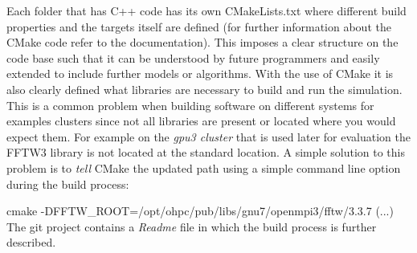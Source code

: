 \documentclass[master.tex]{subfiles}
\begin{document}
Each folder that has C++ code has its own CMakeLists.txt where different build properties and the targets itself are defined (for further information about the CMake code refer to the documentation).\newline
This imposes a clear structure on the code base such that it can be understood by future programmers and easily extended to include further models or algorithms.\newline
With the use of CMake it is also clearly defined what libraries are necessary to build and run the simulation. This is a common problem when building software on different systems for examples clusters since not all libraries are present or located where you would expect them. For example on the \textit{gpu3 cluster} that is used later for evaluation the FFTW3 library is not located at the standard location. A simple solution to this problem is to \textit{tell} CMake the updated path using a simple command line option during the build process:
\begin{blockquote}
  \small
  cmake -DFFTW\_ROOT=/opt/ohpc/pub/libs/gnu7/openmpi3/fftw/3.3.7 (...)\newline
  \newline
  \footnotesize{The git project contains a \textit{Readme} file in which the build process is further described.}
\end{blockquote}
\end{document}
